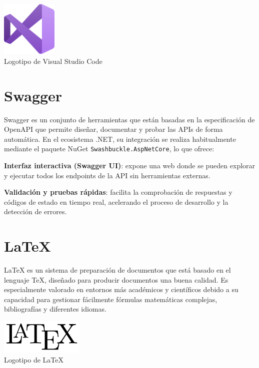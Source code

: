 \begin{center}
  \includegraphics[width=0.2\textwidth]{img/visualstudio-logo.png}\\
  \small Logotipo de Visual Studio Code
\end{center}


\section{Swagger}\label{swagger}

Swagger es un conjunto de herramientas que están basadas en la especificación de OpenAPI que permite diseñar, documentar y probar las APIs de forma automática. En el ecosistema .NET, su integración se realiza habitualmente mediante el paquete NuGet \texttt{Swashbuckle.AspNetCore}, lo que ofrece:

\textbf{Interfaz interactiva (Swagger UI)}: expone una web donde se pueden explorar y ejecutar todos los endpoints de la API sin herramientas externas.

\textbf{Validación y pruebas rápidas}: facilita la comprobación de respuestas y códigos de estado en tiempo real, acelerando el proceso de desarrollo y la detección de errores.


\section{LaTeX}

LaTeX es un sistema de preparación de documentos que está basado en el lenguaje TeX, diseñado para producir documentos una buena calidad. Es especialmente valorado en entornos más académicos y científicos debido a su capacidad para gestionar fácilmente fórmulas matemáticas complejas, bibliografías y diferentes idiomas.

\begin{center}
  \includegraphics[width=0.3\textwidth]{img/latex-logo.png}\\
  \small Logotipo de LaTeX
\end{center}

